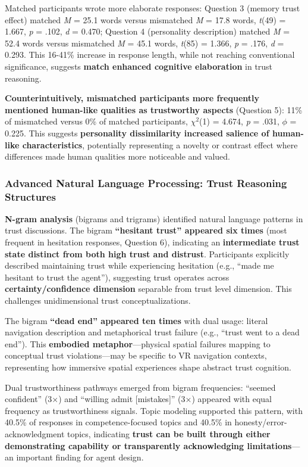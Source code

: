 \documentclass[12pt]{article}
\begin{document}
Matched participants wrote more elaborate responses: Question 3 (memory trust effect) matched \textit{M} = 25.1 words versus mismatched \textit{M} = 17.8 words, \textit{t}(49) = 1.667, \textit{p} = .102, \textit{d} = 0.470; Question 4 (personality description) matched \textit{M} = 52.4 words versus mismatched \textit{M} = 45.1 words, \textit{t}(85) = 1.366, \textit{p} = .176, \textit{d} = 0.293. This 16-41\% increase in response length, while not reaching conventional significance, suggests \textbf{match enhanced cognitive elaboration} in trust reasoning.

\textbf{Counterintuitively, mismatched participants more frequently mentioned human-like qualities as trustworthy aspects} (Question 5): 11\% of mismatched versus 0\% of matched participants, $\chi^2$(1) = 4.674, \textit{p} = .031, $\phi$ = 0.225. This suggests \textbf{personality dissimilarity increased salience of human-like characteristics}, potentially representing a novelty or contrast effect where differences made human qualities more noticeable and valued.

\subsubsection{Advanced Natural Language Processing: Trust Reasoning Structures}

\textbf{N-gram analysis} (bigrams and trigrams) identified natural language patterns in trust discussions. The bigram \textbf{``hesitant trust'' appeared six times} (most frequent in hesitation responses, Question 6), indicating an \textbf{intermediate trust state distinct from both high trust and distrust}. Participants explicitly described maintaining trust while experiencing hesitation (e.g., ``made me hesitant to trust the agent''), suggesting trust operates across \textbf{certainty/confidence dimension} separable from trust level dimension. This challenges unidimensional trust conceptualizations.

The bigram \textbf{``dead end'' appeared ten times} with dual usage: literal navigation description and metaphorical trust failure (e.g., ``trust went to a dead end''). This \textbf{embodied metaphor}---physical spatial failures mapping to conceptual trust violations---may be specific to VR navigation contexts, representing how immersive spatial experiences shape abstract trust cognition.

Dual trustworthiness pathways emerged from bigram frequencies: ``seemed confident'' (3×) and ``willing admit [mistakes]'' (3×) appeared with equal frequency as trustworthiness signals. Topic modeling supported this pattern, with 40.5\% of responses in competence-focused topics and 40.5\% in honesty/error-acknowledgment topics, indicating \textbf{trust can be built through either demonstrating capability or transparently acknowledging limitations}---an important finding for agent design.
\end{document}

